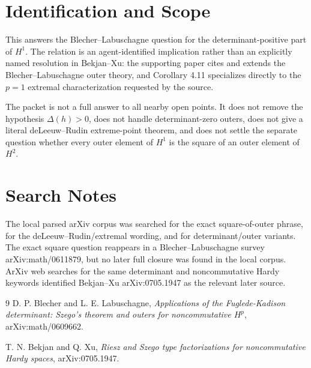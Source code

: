 \documentclass[11pt]{amsart}
\newcommand{\De}{\Delta}
\begin{document}
\section*{Identification and Scope}

This answers the Blecher--Labuschagne question for the determinant-positive
part of \(H^1\).  The relation is an agent-identified implication rather than
an explicitly named resolution in Bekjan--Xu: the supporting paper cites and
extends the Blecher--Labuschagne outer theory, and Corollary 4.11 specializes
directly to the \(p=1\) extremal characterization requested by the source.

The packet is not a full answer to all nearby open points.  It does not remove
the hypothesis \(\De(h)>0\), does not handle determinant-zero outers, does not
give a literal deLeeuw--Rudin extreme-point theorem, and does not settle the
separate question whether every outer element of \(H^1\) is the square of an
outer element of \(H^2\).

\section*{Search Notes}

The local parsed arXiv corpus was searched for the exact square-of-outer phrase,
for the deLeeuw--Rudin/extremal wording, and for determinant/outer variants.
The exact square question reappears in a Blecher--Labuschagne survey
arXiv:math/0611879, but no later full closure was found in the local corpus.
ArXiv web searches for the same determinant and noncommutative Hardy keywords
identified Bekjan--Xu arXiv:0705.1947 as the relevant later source.

\begin{thebibliography}{9}
D. P. Blecher and L. E. Labuschagne,
\emph{Applications of the Fuglede-Kadison determinant: Szego's theorem and
outers for noncommutative \(H^p\)}, arXiv:math/0609662.

T. N. Bekjan and Q. Xu,
\emph{Riesz and Szego type factorizations for noncommutative Hardy spaces},
arXiv:0705.1947.
\end{thebibliography}
\end{document}
